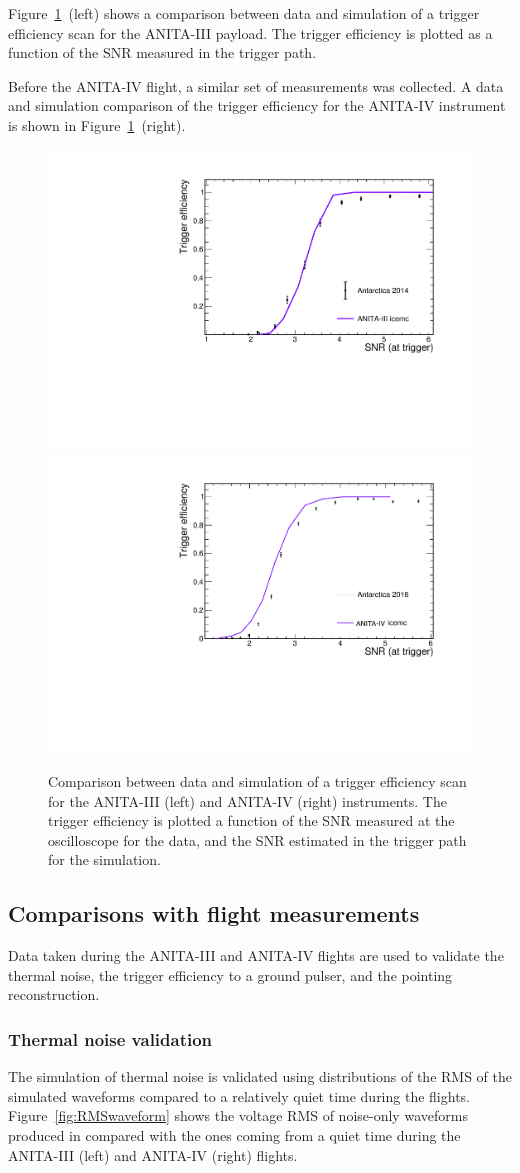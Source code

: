 Figure~\ref{fig:scans}~(left) shows a comparison between data and simulation of a trigger efficiency scan for the ANITA-III payload.
The trigger efficiency is plotted as a function of the SNR
measured in the trigger path.

Before the ANITA-IV flight, a similar set of measurements was collected.
A data and simulation comparison of the trigger efficiency for the ANITA-IV instrument is shown in Figure~\ref{fig:scans}~(right).

\begin{figure}[!h]\centering
  \includegraphics[width=.45\linewidth]{./Figs/EfficiencyScanNoDelaysA3_efficiencyVSsnrTrigger.pdf}
    \includegraphics[width=.45\linewidth]{./Figs/EfficiencyScanNoDelaysA4_efficiencyVSsnrTrigger.pdf}
  \caption{Comparison between data and simulation of a trigger efficiency scan for the ANITA-III (left) and ANITA-IV (right) instruments. 
    The trigger efficiency is plotted a function of the SNR
    measured at the oscilloscope for the data, and the SNR estimated in the trigger path for the simulation. 
    }
  \label{fig:scans}
\end{figure}


\subsection{Comparisons with flight measurements}
\label{subsec:validation_flight}
Data taken during the ANITA-III and ANITA-IV flights are used to validate 
the thermal noise, the trigger efficiency to a ground pulser, and the pointing reconstruction.

\subsubsection{Thermal noise validation}
\label{subsec:ANITA_validation_thermalNoise}
The simulation of thermal noise is validated using distributions of
the RMS of the simulated waveforms compared to a relatively quiet time
during the flights.
Figure~\ref{fig:RMSwaveform} shows the voltage RMS of noise-only waveforms produced
in \icemc compared with the ones coming from a quiet time during
the ANITA-III (left) and ANITA-IV (right) flights.

